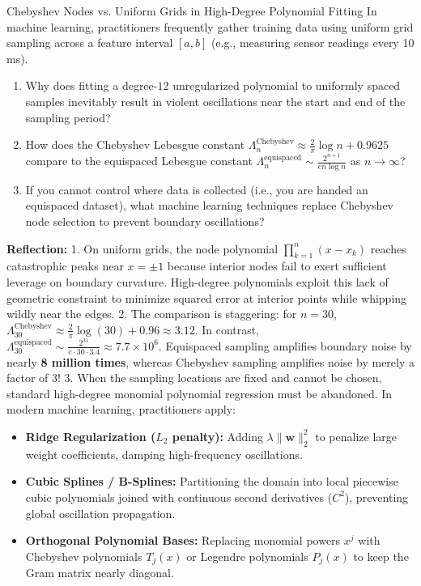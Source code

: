 \begin{ponderbox}{Chebyshev Nodes vs. Uniform Grids in High-Degree Polynomial Fitting}
In machine learning, practitioners frequently gather training data using uniform grid sampling across a feature interval $[a, b]$ (e.g., measuring sensor readings every 10 ms).
\begin{enumerate}
    \item Why does fitting a degree-$12$ unregularized polynomial to uniformly spaced samples inevitably result in violent oscillations near the start and end of the sampling period?
    \item How does the Chebyshev Lebesgue constant $\Lambda_n^{\text{Chebyshev}} \approx \frac{2}{\pi}\log n + 0.9625$ compare to the equispaced Lebesgue constant $\Lambda_n^{\text{equispaced}} \sim \frac{2^{n+1}}{e n \log n}$ as $n \to \infty$?
    \item If you cannot control where data is collected (i.e., you are handed an equispaced dataset), what machine learning techniques replace Chebyshev node selection to prevent boundary oscillations?
\end{enumerate}
\tcblower
\textbf{Reflection:}
1. On uniform grids, the node polynomial $\prod_{k=1}^n (x - x_k)$ reaches catastrophic peaks near $x = \pm 1$ because interior nodes fail to exert sufficient leverage on boundary curvature. High-degree polynomials exploit this lack of geometric constraint to minimize squared error at interior points while whipping wildly near the edges.
2. The comparison is staggering: for $n = 30$, $\Lambda_{30}^{\text{Chebyshev}} \approx \frac{2}{\pi}\log(30) + 0.96 \approx 3.12$. In contrast, $\Lambda_{30}^{\text{equispaced}} \sim \frac{2^{31}}{e \cdot 30 \cdot 3.4} \approx 7.7 \times 10^6$. Equispaced sampling amplifies boundary noise by nearly \textbf{8 million times}, whereas Chebyshev sampling amplifies noise by merely a factor of 3!
3. When the sampling locations are fixed and cannot be chosen, standard high-degree monomial polynomial regression must be abandoned. In modern machine learning, practitioners apply:
\begin{itemize}
    \item \textbf{Ridge Regularization ($L_2$ penalty):} Adding $\lambda \|\mathbf{w}\|_2^2$ to penalize large weight coefficients, damping high-frequency oscillations.
    \item \textbf{Cubic Splines / B-Splines:} Partitioning the domain into local piecewise cubic polynomials joined with continuous second derivatives ($C^2$), preventing global oscillation propagation.
    \item \textbf{Orthogonal Polynomial Bases:} Replacing monomial powers $x^j$ with Chebyshev polynomials $T_j(x)$ or Legendre polynomials $P_j(x)$ to keep the Gram matrix nearly diagonal.
\end{itemize}
\end{ponderbox}

